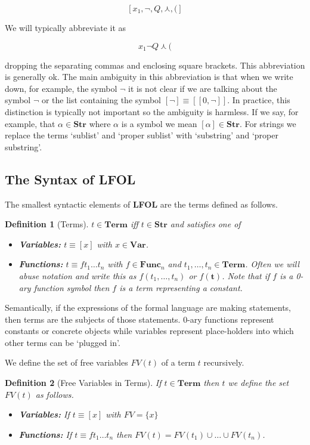 \documentclass[12pt]{article}
\theoremstyle{break}
\newtheorem{definition}{Definition}[section]
\theoremstyle{break}
\theoremstyle{break}
\theoremstyle{break}
\newcommand{\bv}[1]{\boldsymbol{#1}}
\begin{document}
$$
[x_1, \lnot, Q, \curlywedge, (]
$$

We will typically abbreviate it as

$$
x_1\lnot Q\curlywedge (
$$

dropping the separating commas and enclosing square brackets.
This abbreviation is generally ok.
The main ambiguity in this abbreviation is that when we write down, for example, the symbol $\lnot$ it is not clear if we are talking about the symbol $\lnot$ or the list containing the symbol $[\lnot] \equiv [[0, \lnot]]$.
In practice, this distinction is typically not important so the ambiguity is harmless.
If we say, for example, that $\alpha \in \textbf{Str}$ where $\alpha$ is a symbol we mean $[\alpha] \in \textbf{Str}$.
For strings we replace the terms `sublist' and `proper sublist' with `substring' and `proper substring'.


\subsection{The Syntax of LFOL}

The smallest syntactic elements of \textbf{LFOL} are the terms defined as follows.

\begin{definition}[Terms]

$t \in \textbf{Term}$ iff $t \in \textbf{Str}$ and satisfies one of
\begin{itemize}
\item{\textbf{Variables:} $t\equiv [x]$ with $x \in \textbf{Var}$.}
\item{\textbf{Functions:} $t \equiv ft_1 \ldots t_n$ with $f \in \textbf{Func}_n$ and $t_1, \ldots, t_n \in \textbf{Term}$. Often we will abuse notation and write this as $f(t_1, \ldots, t_n)$ or $f(\bv{t})$. Note that if $f$ is a 0-ary function symbol then $f$ is a term representing a constant.}
\end{itemize}
\end{definition}

Semantically, if the expressions of the formal language are making statements, then terms are the subjects of those statements.
0-ary functions represent constants or concrete objects while variables represent place-holders into which other terms can be `plugged in'.

We define the set of free variables $FV(t)$ of a term $t$ recursively.

\begin{definition}[Free Variables in Terms]
If $t\in \textbf{Term}$ then $t$ we define the set $FV(t)$ as follows.
\begin{itemize}
\item{\textbf{Variables:} If $t\equiv [x]$ with $FV = \{x\}$}
\item{\textbf{Functions:} If $t\equiv ft_1\ldots t_n$ then $FV(t) = FV(t_1)\cup\ldots \cup FV(t_n)$.}
\end{itemize}
\end{definition}
\end{document}
